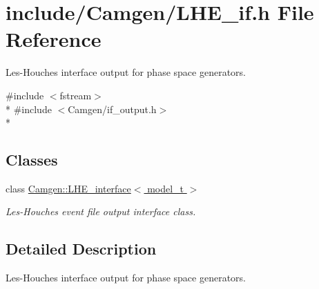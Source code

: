 \hypertarget{a00659}{\section{include/\-Camgen/\-L\-H\-E\-\_\-if.h File Reference}
\label{a00659}
}


Les-\/\-Houches interface output for phase space generators.  


{\ttfamily \#include $<$fstream$>$}\\*
{\ttfamily \#include $<$Camgen/if\-\_\-output.\-h$>$}\\*
\subsection*{Classes}
\begin{DoxyCompactItemize}
\item 
class \hyperlink{a00323}{Camgen\-::\-L\-H\-E\-\_\-interface$<$ model\-\_\-t $>$}
\begin{DoxyCompactList}\small\item\em Les-\/\-Houches event file output interface class. \end{DoxyCompactList}\end{DoxyCompactItemize}


\subsection{Detailed Description}
Les-\/\-Houches interface output for phase space generators. 